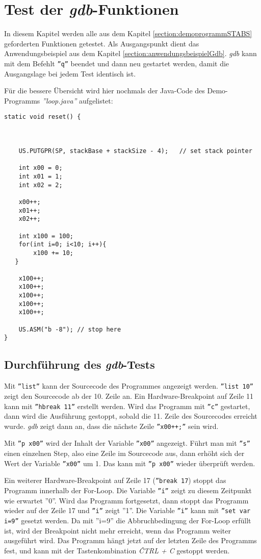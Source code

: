 \section{Test der \textit{gdb}-Funktionen}
In diesem Kapitel werden alle aus dem Kapitel \ref{section:demoprogrammSTABS} geforderten Funktionen getestet.
Als Ausgangspunkt dient das Anwendungsbeispiel aus dem Kapitel \ref{section:anwendungsbeispielGdb}.
\textit{gdb} kann mit dem Befehlt \texttt{''q''} beendet und dann neu gestartet werden, damit die Ausgangslage bei jedem Test identisch ist.


Für die bessere Übersicht wird hier nochmals der Java-Code des Demo-Programms \textit{''loop.java''} aufgelistet:
\lstset{language=java}
\begin{lstlisting}
static void reset() {



	US.PUTGPR(SP, stackBase + stackSize - 4);	// set stack pointer
	
	int x00 = 0;
	int x01 = 1;
	int x02 = 2;
	
	x00++;
	x01++;
	x02++;
	
	int x100 = 100;
	for(int i=0; i<10; i++){
		x100 += 10;
   }
		
	x100++;
	x100++;
	x100++;
	x100++;
	x100++;

	US.ASM("b -8"); // stop here
}
\end{lstlisting}


\subsection{Durchführung des \textit{gdb}-Tests}
Mit \texttt{''list''} kann der Sourcecode des Programmes angezeigt werden.
\texttt{''list 10''} zeigt den Sourcecode ab der 10. Zeile an.
Ein Hardware-Breakpoint auf Zeile 11 kann mit \texttt{''hbreak 11''} erstellt werden.
Wird das Programm mit \texttt{''c''} gestartet, dann wird die Ausführung gestoppt, sobald die 11. Zeile des Sourcecodes erreicht wurde.
\textit{gdb} zeigt dann an, dass die nächste Zeile \texttt{''x00++;''} sein wird.

Mit \texttt{''p x00''} wird der Inhalt der Variable \texttt{''x00''} angezeigt.
Führt man mit \texttt{''s''} einen einzelnen Step, also eine Zeile im Sourcecode aus, dann erhöht sich der Wert der Variable \texttt{''x00''} um 1.
Das kann mit \texttt{''p x00''}  wieder überprüft werden.


Ein weiterer Hardware-Breakpoint auf Zeile 17 (\texttt{''break 17}) stoppt das Programm innerhalb der For-Loop.
Die Variable \texttt{''i''} zeigt zu diesem Zeitpunkt wie erwartet ''0''.
Wird das Programm fortgesetzt, dann stoppt das Programm wieder auf der Zeile 17 und \texttt{''i''} zeigt ''1''.
Die Variable \texttt{''i''} kann mit \texttt{''set var i=9''} gesetzt werden.
Da mit ''i=9'' die Abbruchbedingung der For-Loop erfüllt ist, wird der Breakpoint nicht mehr erreicht, wenn das Programm weiter ausgeführt wird.
Das Programm hängt jetzt auf der letzten Zeile des Programms fest, und kann mit der Tastenkombination \textit{ĈTRL + C} gestoppt werden.

